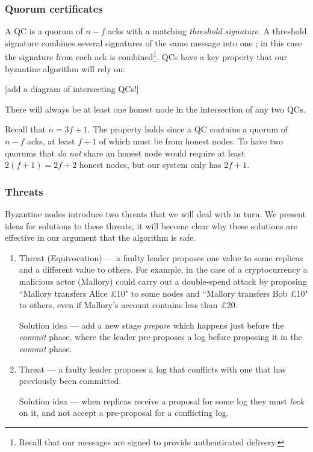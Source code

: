 \subsubsection{Quorum certificates}

A QC is a quorum of $n - f$ acks with a matching \textit{threshold signature}. A threshold signature combines several signatures of the same message into one \cite{goos_practical_2000}\cite{cachin_random_2005}; in this case the signature from each ack is combined\footnote{Recall that our messages are signed to provide authenticated delivery.}. QCs have a key property that our byzantine algorithm will rely on:

[add a diagram of intersecting QCs!]

\begin{property} \label{qcproperty}
There will always be at least one honest node in the intersection of any two QCs.
\end{property}

Recall that $n = 3f + 1$. The property holds since a QC contains a quorum of $n - f$ acks, at least $f + 1$ of which must be from honest nodes. To have two quorums that \textit{do not} share an honest node would require at least $2(f + 1) = 2f + 2$ honest nodes, but our system only has $2f + 1$.

\subsubsection{Threats}
Byzantine nodes introduce two threats that we will deal with in turn. We present ideas for solutions to these threats; it will become clear why these solutions are effective in our argument that the algorithm is safe.

\begin{enumerate}
\item Threat (Equivocation) --- a faulty leader proposes one value to some replicas and a different value to others. For example, in the case of a cryptocurrency a malicious actor (Mallory) could carry out a double-spend attack by proposing ``Mallory transfers Alice £10" to some nodes and ``Mallory transfers Bob £10" to others, even if Mallory's account contains less than £20. \label{threat1}

Solution idea --- add a new stage \textit{prepare} which happens just before the \textit{commit} phase, where the leader pre-proposes a log before proposing it in the \textit{commit} phase.

\item Threat --- a faulty leader proposes a log that conflicts with one that has previously been committed. \label{threat2}

Solution idea --- when replicas receive a proposal for some log they must \textit{lock} on it, and not accept a pre-proposal for a conflicting log.
\end{enumerate}

